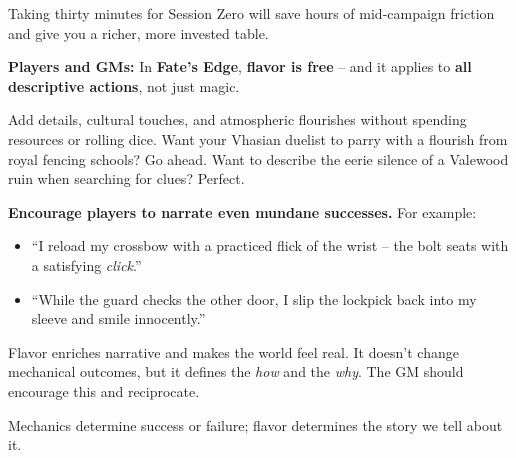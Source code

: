 Taking thirty minutes for Session Zero will save hours of mid-campaign friction and give you a richer, more invested table.

\begin{tcolorbox}[enhanced, sharp corners, boxrule=1pt, colback=gray!5!white, colframe=gray!75!black, title={Flavor is Free (Even for Mundane Actions)},breakable]
\textbf{Players and GMs:} In \textbf{Fate's Edge}, \textbf{flavor is free} -- and it applies to \textbf{all descriptive actions}, not just magic.

Add details, cultural touches, and atmospheric flourishes without spending resources or rolling dice. Want your Vhasian duelist to parry with a flourish from royal fencing schools? Go ahead. Want to describe the eerie silence of a Valewood ruin when searching for clues? Perfect.

\textbf{Encourage players to narrate even mundane successes.} For example:
\begin{itemize}
    \item ``I reload my crossbow with a practiced flick of the wrist -- the bolt seats with a satisfying \textit{click}.''
    \item ``While the guard checks the other door, I slip the lockpick back into my sleeve and smile innocently.''
\end{itemize}
Flavor enriches narrative and makes the world feel real. It doesn't change mechanical outcomes, but it defines the \emph{how} and the \emph{why}. The GM should encourage this and reciprocate.

Mechanics determine success or failure; flavor determines the story we tell about it.
\end{tcolorbox}

